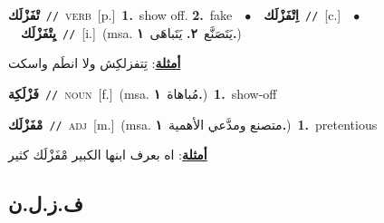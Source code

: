 \documentclass[10pt,a4paper,twoside]{article} %
\begin{document}
\begin{multicols}{2}
{\setlength\topsep{0pt}\textbf{\foreignlanguage{arabic}{تْفَزْلَك}}\ {\color{gray}\texttt{//}\color{black}}\ \textsc{verb}\ [p.]\ \textbf{1.}~show off.  \textbf{2.}~fake\ \ $\bullet$\ \ \setlength\topsep{0pt}\textbf{\foreignlanguage{arabic}{اِتْفَزْلَك}}\ {\color{gray}\texttt{//}\color{black}}\ [c.]\ \ $\bullet$\ \ \setlength\topsep{0pt}\textbf{\foreignlanguage{arabic}{يِتْفَزْلَك}}\ {\color{gray}\texttt{//}\color{black}}\ [i.]\ \color{gray}(msa. \foreignlanguage{arabic}{يَتَصَنَّع}~\foreignlanguage{arabic}{\textbf{٢.}}  \foreignlanguage{arabic}{يَتَباهَى}~\foreignlanguage{arabic}{\textbf{١.}})\color{black}\  \begin{flushright}\color{gray}\foreignlanguage{arabic}{\textbf{\underline{\foreignlanguage{arabic}{أمثلة}}}: تِتفزلكِش ولا انطَم واسكت}\end{flushright}\color{black}} \vspace{2mm}

{\setlength\topsep{0pt}\textbf{\foreignlanguage{arabic}{فَزْلَكِة}}\ {\color{gray}\texttt{//}\color{black}}\ \textsc{noun}\ [f.]\ \color{gray}(msa. \foreignlanguage{arabic}{مُباهاة}~\foreignlanguage{arabic}{\textbf{١.}})\color{black}\ \textbf{1.}~show-off\ } \vspace{2mm}

{\setlength\topsep{0pt}\textbf{\foreignlanguage{arabic}{مْفَزْلَك}}\ {\color{gray}\texttt{//}\color{black}}\ \textsc{adj}\ [m.]\ \color{gray}(msa. \foreignlanguage{arabic}{متصنع ومدَّعي الأهمية}~\foreignlanguage{arabic}{\textbf{١.}})\color{black}\ \textbf{1.}~pretentious\  \begin{flushright}\color{gray}\foreignlanguage{arabic}{\textbf{\underline{\foreignlanguage{arabic}{أمثلة}}}: اه بعرف ابنها الكبير مْفَزْلَك كثير}\end{flushright}\color{black}} \vspace{2mm}

\vspace{-3mm}
\subsection*{\color{blue}\foreignlanguage{arabic}{ف.ز.ل.ن}\color{blue}{ (ntws)}} 


\end{multicols}
\end{document}
